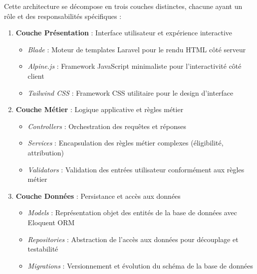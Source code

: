 \documentclass[french,12pt]{report} %
\begin{document}
Cette architecture se décompose en trois couches distinctes, chacune ayant un rôle et des responsabilités spécifiques :

\begin{enumerate}
    \item \textbf{Couche Présentation} : Interface utilisateur et expérience interactive
    \begin{itemize}
        \item \textit{Blade} : Moteur de templates Laravel pour le rendu HTML côté serveur
        \item \textit{Alpine.js} : Framework JavaScript minimaliste pour l'interactivité côté client
        \item \textit{Tailwind CSS} : Framework CSS utilitaire pour le design d'interface
    \end{itemize}
    
    \item \textbf{Couche Métier} : Logique applicative et règles métier
    \begin{itemize}
        \item \textit{Controllers} : Orchestration des requêtes et réponses
        \item \textit{Services} : Encapsulation des règles métier complexes (éligibilité, attribution)
        \item \textit{Validators} : Validation des entrées utilisateur conformément aux règles métier
    \end{itemize}
    
    \item \textbf{Couche Données} : Persistance et accès aux données
    \begin{itemize}
        \item \textit{Models} : Représentation objet des entités de la base de données avec Eloquent ORM
        \item \textit{Repositories} : Abstraction de l'accès aux données pour découplage et testabilité
        \item \textit{Migrations} : Versionnement et évolution du schéma de la base de données
    \end{itemize}
\end{enumerate}
\end{document}
